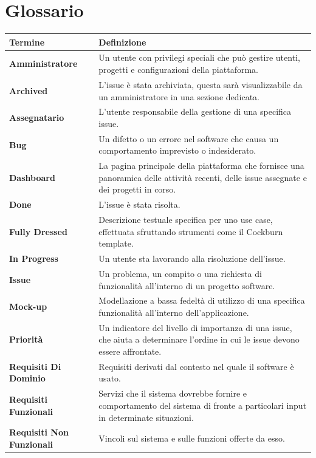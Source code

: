 \section{Glossario}\label{Glossario}

\begin{table}[H]
\begin{tabularx}{\textwidth}{|l|X|}
    \hline
    \textbf{Termine} & \textbf{Definizione} \\
    \hline
    \textbf{Amministratore} & Un utente con privilegi speciali che può gestire utenti, progetti e configurazioni della piattaforma. \\
    \hline
    \textbf{Archived} & L'issue è stata archiviata, questa sarà visualizzabile da un amministratore in una sezione dedicata. \\
    \hline
    \textbf{Assegnatario} & L'utente responsabile della gestione di una specifica issue. \\
    \hline
    \textbf{Bug} & Un difetto o un errore nel software che causa un comportamento imprevisto o indesiderato. \\
    \hline
    \textbf{Dashboard} & La pagina principale della piattaforma che fornisce una panoramica delle attività recenti, delle issue assegnate e dei progetti in corso. \\
    \hline
    \textbf{Done} & L'issue è stata risolta. \\
    \hline
    \textbf{Fully Dressed} & Descrizione testuale specifica per uno use case, effettuata sfruttando strumenti come il Cockburn template. \\
    \hline
    \textbf{In Progress} & Un utente sta lavorando alla risoluzione dell'issue. \\
    \hline
    \textbf{Issue} & Un problema, un compito o una richiesta di funzionalità all'interno di un progetto software. \\
    \hline
    \textbf{Mock-up} & Modellazione a bassa fedeltà di utilizzo di una specifica funzionalità all'interno dell'applicazione. \\
    \hline
    \textbf{Priorità} & Un indicatore del livello di importanza di una issue, che aiuta a determinare l'ordine in cui le issue devono essere affrontate. \\
    \hline
    \textbf{Requisiti Di Dominio} & Requisiti derivati dal contesto nel quale il software è usato. \\
    \hline
    \textbf{Requisiti Funzionali} & Servizi che il sistema dovrebbe fornire e comportamento del sistema di fronte a particolari input in determinate situazioni. \\
    \hline
    \textbf{Requisiti Non Funzionali} & Vincoli sul sistema e sulle funzioni offerte da esso. \\
    \hline
\end{tabularx}
\end{table}

